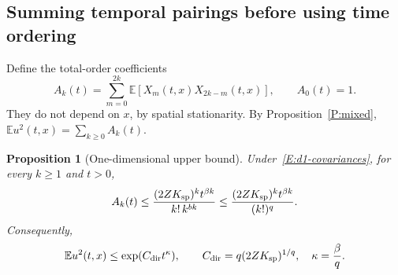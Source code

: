 \documentclass[12pt,oneside,openany]{book}
\makeatletter
\let\lean@pending\@empty
\newcommand{\LeanMarker}[1]{\gdef\lean@pending{#1}}
\numberwithin{equation}{section}
\newtheorem{proposition}[theorem]{Proposition}
\theoremstyle{nogostyle}
\theoremstyle{definition}
\newcommand{\E}{\mathbb{E}}
\makeatother
\begin{document}
\subsection{Summing temporal pairings before using time ordering}

Define the total-order coefficients
\[
  A_k(t)=\sum_{m=0}^{2k}\E[X_m(t,x)X_{2k-m}(t,x)],\qquad A_0(t)=1.
\]
They do not depend on $x$, by spatial stationarity. By
Proposition~\ref{P:mixed}, $\E u^2(t,x) = \sum_{k\ge0}A_k(t)$.

\LeanMarker{P:d1-upper}
\begin{proposition}[One-dimensional upper bound]\label{P:d1-upper}
  Under~\eqref{E:d1-covariances}, for every $k \ge 1$ and $t > 0$,
  \begin{equation}\label{E:d1-coefficient}
    A_k(t)\le
    \frac{(2ZK_{\rm sp})^k t^{\beta k}}{k!\,k^{bk}}
    \le\frac{(2ZK_{\rm sp})^k t^{\beta k}}{(k!)^q}.
  \end{equation}
  Consequently,
  \begin{equation}\label{E:d1-upper}
    \E u^2(t,x)\le\exp(C_{\rm dir}t^\kappa),\qquad
    C_{\rm dir}=q(2ZK_{\rm sp})^{1/q},\quad \kappa=\frac{\beta}{q}.
  \end{equation}
\end{proposition}
\end{document}
